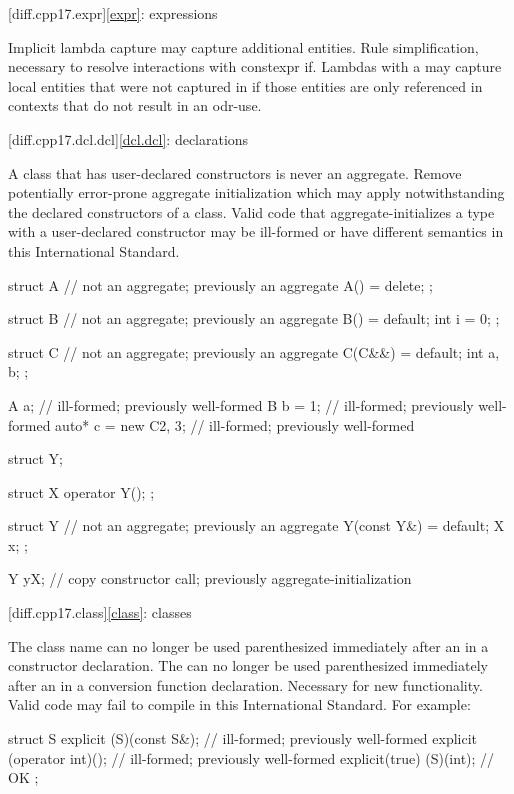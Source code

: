 [diff.cpp17.expr]{\ref{expr}: expressions}

\change Implicit lambda capture may capture additional entities.
\rationale Rule simplification, necessary to resolve interactions with constexpr if.
\effect Lambdas with a 
may capture local entities
that were not captured in \CppXVII{}
if those entities are only referenced in contexts
that do not result in an odr-use.

[diff.cpp17.dcl.dcl]{\ref{dcl.dcl}: declarations}

\change A class that has user-declared constructors is never an aggregate.
\rationale Remove potentially error-prone aggregate initialization
which may apply notwithstanding the declared constructors of a class.
\effect Valid \CppXVII{} code that aggregate-initializes
a type with a user-declared constructor
may be ill-formed or have different semantics
in this International Standard.
\begin{codeblock}
struct A {              // not an aggregate; previously an aggregate
  A() = delete;
};

struct B {              // not an aggregate; previously an aggregate
  B() = default;
  int i = 0;
};

struct C {              // not an aggregate; previously an aggregate
  C(C&&) = default;
  int a, b;
};

A a{};                  // ill-formed; previously well-formed
B b = {1};              // ill-formed; previously well-formed
auto* c = new C{2, 3};  // ill-formed; previously well-formed

struct Y;

struct X {
  operator Y();
};

struct Y {              // not an aggregate; previously an aggregate
  Y(const Y&) = default;
  X x;
};

Y y{X{}};               // copy constructor call; previously aggregate-initialization
\end{codeblock}

[diff.cpp17.class]{\ref{class}: classes}

\change
The class name can no longer be used parenthesized
immediately after an  
in a constructor declaration.
The  can no longer be used parenthesized
immediately after an  
in a conversion function declaration.
\rationale
Necessary for new functionality.
\effect
Valid \CppXVII{} code may fail to compile
in this International Standard. For example:
\begin{codeblock}
struct S {
  explicit (S)(const S&);       // ill-formed; previously well-formed
  explicit (operator int)();    // ill-formed; previously well-formed
  explicit(true) (S)(int);      // OK
};
\end{codeblock}

